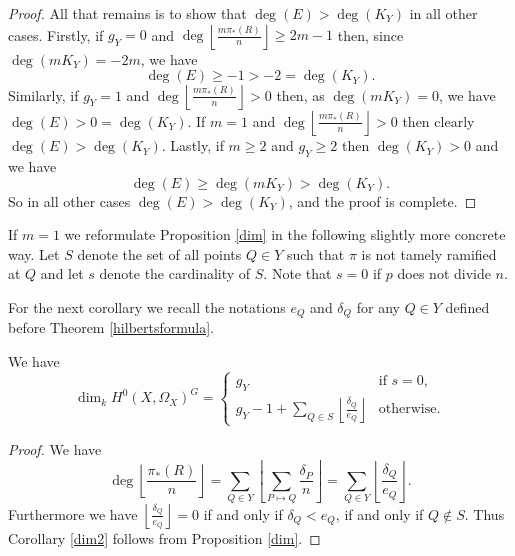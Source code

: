 \begin{proof}
    
    All that remains is to show that $\deg(E)>\deg(K_Y)$ in all other cases.
    Firstly, if $g_Y=0$ and $\deg \left\lfloor\frac{m\pi_*(R)}{n} \right\rfloor \geq 2m-1$ then, since $\deg(mK_Y)=-2m$, we have 
        \[
        \deg \left( E \right) \geq -1 >-2 = \deg(K_Y).
        \]
    Similarly, if $g_Y=1$ and $\deg \left\lfloor\frac{m\pi_*(R)}{n} \right\rfloor >0$ then, as $\deg \left( mK_Y \right)=0$, we have $\deg \left( E \right) > 0 = \deg (K_Y)$.
    If $m=1$ and $\deg \left\lfloor\frac{m\pi_*(R)}{n} \right\rfloor >0$ then clearly $\deg \left( E \right) > \deg (K_Y)$.
    Lastly, if $m\geq 2$ and $g_Y\geq 2$ then $\deg (K_Y) > 0$ and we have 
        \begin{equation*}
        \deg \left( E \right) \geq \deg\left( mK_Y \right) > \deg (K_Y).
        \end{equation*}
    So in all other cases $\deg(E)>\deg(K_Y)$, and the proof is complete.
    \end{proof}


If $m=1$ we reformulate Proposition \ref{dim} in the following slightly more concrete way. 
Let $S$ denote the set of all points $Q\in Y$ such that $\pi$ is not tamely ramified at $Q$ and let $s$ denote the cardinality of $S$. 
Note that $s=0$ if $p$ does not divide $n$.


For the next corollary we recall the notations $e_Q$ and $\delta_Q$ for any $Q\in Y$ defined before Theorem \ref{hilbertsformula}.


    \begin{cor}\label{dim2}
    We have 
        \begin{equation*}
        \dim_kH^0(X,\Omega_X)^G = 
            \begin{cases}
            g_Y & \mbox{if } s=0, \\
            g_Y-1+\sum_{Q\in S}\left\lfloor \frac{\delta_Q}{e_Q} \right\rfloor & \mbox{otherwise}.
            \end{cases}
        \end{equation*}
    \end{cor}
    \begin{proof}
    We have
        \[
        \deg\left\lfloor\frac{\pi_*(R)}{n} \right\rfloor = \sum_{Q\in Y}\left\lfloor\sum_{P\mapsto Q} \frac{\delta_P}{n} \right\rfloor = \sum_{Q\in Y} \left\lfloor \frac{\delta_Q}{e_Q} \right\rfloor.
        \]
    Furthermore we have $\left\lfloor \frac{\delta_Q}{e_Q} \right\rfloor = 0$ if and only if $\delta_Q<e_Q$, \ie if and only if $Q\notin S$. 
    Thus Corollary \ref{dim2} follows from Proposition \ref{dim}.
    \end{proof}

